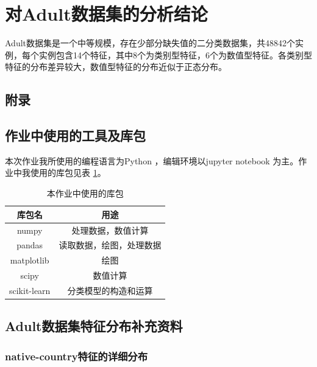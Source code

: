 \documentclass[12pt,a4paper]{article}
\theoremstyle{definition}
\begin{document}
\section{对Adult数据集的分析结论}

Adult数据集是一个中等规模，存在少部分缺失值的二分类数据集，共48842个实例，每个实例包含14个特征，其中8个为类别型特征，6个为数值型特征。各类别型特征的分布差异较大，数值型特征的分布近似于正态分布。

\newpage
\begin{appendix}
	\section{附录}
	\subsection{作业中使用的工具及库包}
	\label{apd:tools}
	本次作业我所使用的编程语言为Python \cite{python}，编辑环境以jupyter notebook \cite{notebook} 为主。作业中我使用的库包见表 \ref{tab:import}。
	
	\begin{table}[H]
		\renewcommand\arraystretch{1.35}
		\caption{本作业中使用的库包}
		\label{tab:import}
		\centering
		
		\begin{tabular}{c|c}
			\centering
			库包名 &  用途 \\
			\hline
	
			numpy \cite{numpy} & 处理数据，数值计算 \\
			pandas \cite{pandas} & 读取数据，绘图，处理数据 \\
			matplotlib \cite{matplotlib} & 绘图 \\
			scipy \cite{scipy} & 数值计算 \\
			scikit-learn \cite{sklearn} & 分类模型的构造和运算 \\
	
		\end{tabular}
	\end{table}
	
	\subsection{Adult数据集特征分布补充资料}
	
	\subsubsection{native-country特征的详细分布}
	\label{apd:native-country}
	

\end{appendix}
\end{document}
